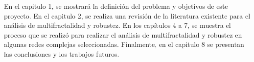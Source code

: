 En el capitulo 1, se mostrará la definición del problema y objetivos de este proyecto. En el capitulo 2, se realiza una revisión de la literatura existente para el análisis de multifractalidad y robustez. En los capítulos 4 a 7, se muestra el proceso que se realizó para realizar el análisis de multifractalidad y robustez en algunas redes complejas seleccionadas. Finalmente, en el capitulo 8 se presentan las conclusiones y los trabajos futuros.